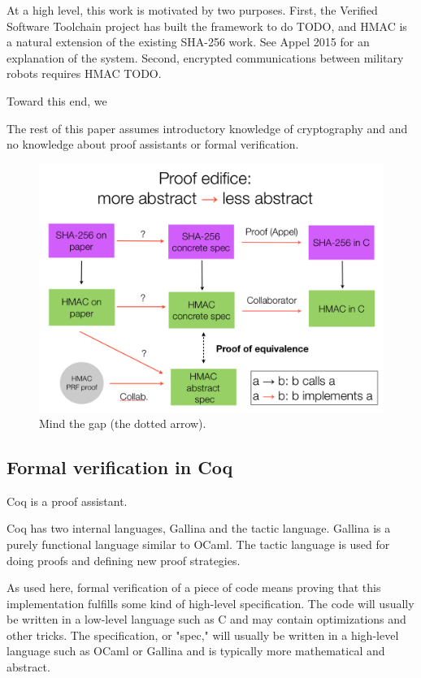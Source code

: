 \documentclass[twocolumn,showpacs,%
  nofootinbib,aps,superscriptaddress,%
  eqsecnum,prd,notitlepage,showkeys,10pt]{revtex4-1}
\begin{document}
At a high level, this work is motivated by two purposes. First, the Verified Software Toolchain project has built the framework to do TODO, and HMAC is a natural extension of the existing SHA-256 work. See Appel 2015 for an explanation of the system. Second, encrypted communications between military robots requires HMAC TODO. 

Toward this end, we

The rest of this paper assumes introductory knowledge of cryptography and and no knowledge about proof assistants or formal verification.

\begin{figure}[h!]
	\centering
	\includegraphics[scale=0.35]{Proof_edifice}
	\caption{Mind the gap (the dotted arrow).}
\end{figure}	

\subsection{Formal verification in Coq}

Coq is a proof assistant.

Coq has two internal languages, Gallina and the tactic language. Gallina is a purely functional language similar to OCaml. The tactic language is used for doing proofs and defining new proof strategies.

As used here, formal verification of a piece of code means proving that this implementation fulfills some kind of high-level specification. The code will usually be written in a low-level language such as C and may contain optimizations and other tricks. The specification, or "spec," will usually be written in a high-level language such as OCaml or Gallina and is typically more mathematical and abstract.
\end{document}
